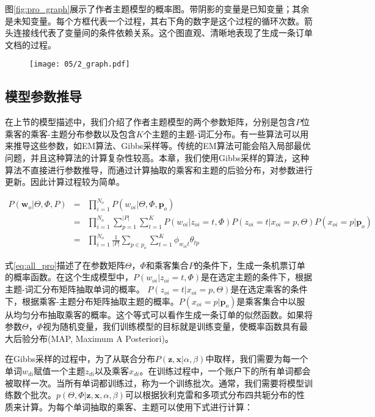 图\ref{fig:pro_graph}展示了作者主题模型的概率图。带阴影的变量是已知变量；其余是未知变量。每个方框代表一个过程，其右下角的数字是这个过程的循环次数。箭头连接线代表了变量间的条件依赖关系。这个图直观、清晰地表现了生成一条订单文档的过程。

\begin{figure}
 \centering
 \texttt{[image: 05/2\_graph.pdf]}
\end{figure}

\subsection{模型参数推导}
在上节的模型描述中，我们介绍了作者主题模型的两个参数矩阵，分别是包含$P$位乘客的乘客-主题分布参数以及包含$K$个主题的主题-词汇分布。有一些算法可以用来推导这些参数，如EM算法、Gibbs采样等。传统的EM算法可能会陷入局部最优问题，并且这种算法的计算复杂性较高。本章，我们使用Gibbs采样的算法，这种算法不直接进行参数推导，而通过计算抽取的乘客和主题的后验分布，对参数进行更新。因此计算过程较为简单。


\begin{eqnarray}
\label{eq:all_pro}
P(\mathbf{w}_o | \Theta,\Phi,P) & = & \prod_{i=1}^{N_o}P(w_{oi}|\Theta,\Phi,\mathbf{p}_o) 
\nonumber \\
 & = & \prod_{i=1}^{N_o}\sum_{p=1}^{|P|}\sum_{t=1}^{K}P(w_{oi}|z_{oi}=t,\Phi)
P(z_{oi}=t|x_{oi}=p,\Theta)P(x_{oi}=p|\mathbf{p}_o) \nonumber \\
 & = & \prod_{i=1}^{N_o}\frac{1}{|P|}\sum_{p \in p_o}\sum_{t=1}^{K}\phi_{w_{oi}t}\theta_{tp}
\end{eqnarray}


式\ref{eq:all_pro}描述了在参数矩阵$\Theta$，$\Phi$和乘客集合$P$的条件下，生成一条机票订单的概率函数。在这个生成模型中，$P(w_{oi}|z_{oi}=t,\Phi)$是在选定主题的条件下，根据主题-词汇分布矩阵抽取单词的概率。
$P(z_{oi}=t|x_{oi}=p,\Theta)$是在选定乘客的条件下，根据乘客-主题分布矩阵抽取主题的概率。$P(x_{oi}=p|\mathbf{p}_o)$是乘客集合中以服从均匀分布抽取乘客的概率。这个等式可以看作生成一条订单的似然函数。如果将参数$\Theta$，$\Phi$视为随机变量，我们训练模型的目标就是训练变量，使概率函数具有最大后验分布(MAP, Maximum A Posteriori)。 

在Gibbs采样的过程中，为了从联合分布$P(\mathbf{z},\mathbf{x}|\alpha,\beta)$中取样，我们需要为每一个单词$w_{di}$赋值一个主题$z_{di}$以及乘客$x_{di}$。在训练过程中，一个账户下的所有单词都会被取样一次。当所有单词都训练过，称为一个训练批次。通常，我们需要将模型训练数个批次。$p(\Theta,\Phi|\mathbf{z},\mathbf{x},\alpha,\beta)$可以根据狄利克雷和多项式分布四共轭分布的性质来计算。为每个单词抽取的乘客、主题可以使用下式进行计算：

